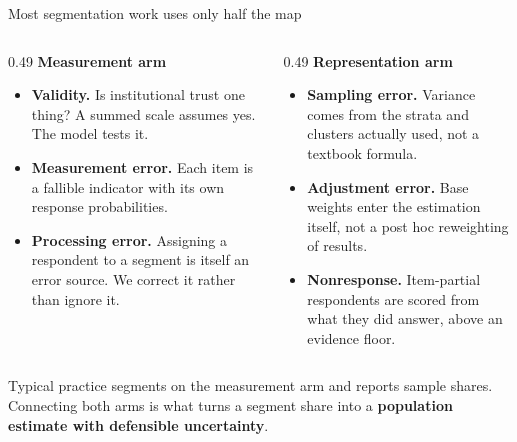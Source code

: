 \documentclass[
  ignorenonframetext,
  aspectratio=169,
]{beamer}
\newcommand{\kicker}[1]{\par\noindent{\footnotesize\color{vteal}\textbf{\MakeUppercase{#1}}}\par\vspace{0.4em}}
\begin{document}
\begin{frame}[shrink]{Most segmentation work uses only half the map}
\label{most-segmentation-work-uses-only-half-the-map}
\kicker{where this project sits}

\footnotesize

\begin{columns}[T]
\begin{column}{0.49\textwidth}
\textbf{\color{vpurple}Measurement arm}

\vspace{0.3em}
\begin{itemize}\itemsep3pt
  \item \textbf{Validity.} Is institutional trust one thing? A summed scale assumes yes. The model tests it.
  \item \textbf{Measurement error.} Each item is a fallible indicator with its own response probabilities.
  \item \textbf{Processing error.} Assigning a respondent to a segment is itself an error source. We correct it rather than ignore it.
\end{itemize}
\end{column}
\begin{column}{0.49\textwidth}
\textbf{\color{vpurple}Representation arm}

\vspace{0.3em}
\begin{itemize}\itemsep3pt
  \item \textbf{Sampling error.} Variance comes from the strata and clusters actually used, not a textbook formula.
  \item \textbf{Adjustment error.} Base weights enter the estimation itself, not a post hoc reweighting of results.
  \item \textbf{Nonresponse.} Item-partial respondents are scored from what they did answer, above an evidence floor.
\end{itemize}
\end{column}
\end{columns}

\vspace{0.6em}

\begin{center}
\colorbox{vteal!15}{\parbox{0.93\textwidth}{\centering
Typical practice segments on the measurement arm and reports sample shares. \\
Connecting both arms is what turns a segment share into a \textbf{population estimate with defensible uncertainty}.}}
\end{center}

\end{frame}
\end{document}

